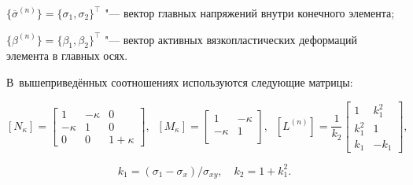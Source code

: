 $\{\overline \sigma^{(n)}\}=\{\sigma_1, \sigma_2 \}^\top $ "--- вектор главных напряжений внутри конечного элемента;

$\{\beta^{(n)} \}=\{\beta_1, \beta_2 \}^\top $ "--- вектор активных вязкопластических деформаций элемента в главных осях.

В~вышеприведённых соотношениях  используются следующие матрицы:

$$

[N_\kappa]=\left[

\begin{array}{ccc}

1       & -\kappa & 0 \\

-\kappa &    1    & 0 \\

0       &    0    & 1+\kappa

\end{array}

\right] ,

\; \;

[M_\kappa]=\left[

\begin{array}{cc}

1       & -\kappa   \\

-\kappa &    1     \\

\end{array}

\right] , \; \;

[L^{(n)}]=\frac{\displaystyle 1}{\displaystyle k_2}

\left[

\begin{array}{cc}

1       & k_1^2  \\

k_1^2 &    1     \\

k_1   &   -k_1

\end{array}

\right] ,

$$

$$

k_1=(\sigma_1 -\sigma_x)/{\sigma_{xy}},

\quad k_2=1+k_1^2.

$$







